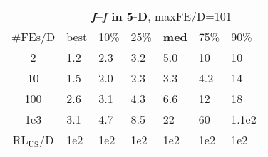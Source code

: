 \begin{tabular}{c|llllll}
 & \multicolumn{6}{|c}{\textbf{\textit{f}\raisebox{-0.35ex}{1}--\textit{f}\raisebox{-0.35ex}{24} in 5-D}, maxFE/D=101}\\
\#FEs/D & best & 10\% & 25\% & \textbf{med} & 75\% & 90\%\\
2 & \hspace*{1ex}1.2 & \hspace*{1ex}2.3 & \hspace*{1ex}3.2 & \hspace*{1ex}5.0 & 10 & 10\\
10 & \hspace*{1ex}1.5 & \hspace*{1ex}2.0 & \hspace*{1ex}2.3 & \hspace*{1ex}3.3 & \hspace*{1ex}4.2 & 14\\
100 & \hspace*{1ex}2.6 & \hspace*{1ex}3.1 & \hspace*{1ex}4.3 & \hspace*{1ex}6.6 & 12 & 18\\
1e3 & \hspace*{1ex}3.1 & \hspace*{1ex}4.7 & \hspace*{1ex}8.5 & 22 & 60 & 1.1e2\\
$\text{RL}_{\text{US}}$/D & 1e2 & 1e2 & 1e2 & 1e2 & 1e2 & 1e2
\end{tabular}

